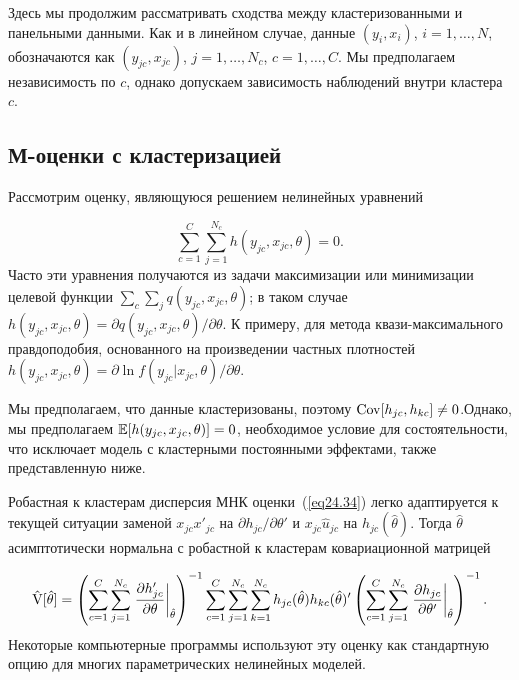 Здесь мы продолжим рассматривать сходства между кластеризованными и панельными данными. Как и в линейном случае, данные $(y_i, x_i)$, $i = 1, \dots, N$, обозначаются как $(y_{jc}, x_{jc})$, $j = 1, \dots, N_c$, $c = 1, \dots, C$. Мы предполагаем независимость по $c$, однако допускаем зависимость наблюдений внутри кластера $c$. 

\subsection*{М-оценки с кластеризацией}

Рассмотрим оценку, являющуюся решением нелинейных уравнений

\begin{equation}
\label{eq24.44}
\sum_{c=1}^{C} \sum_{j=1}^{N_c} h (y_{jc}, x_{jc}, \theta) = 0.
\end{equation}
Часто эти уравнения получаются из задачи максимизации или минимизации целевой функции $\sum_c \sum_j q(y_{jc}, x_{jc}, \theta)$; в таком случае $  h (y_{jc}, x_{jc}, \theta) = \partial q(y_{jc}, x_{jc}, \theta) / \partial \theta$. К примеру, для метода квази-максимального правдоподобия, основанного на произведении частных плотностей $ h (y_{jc}, x_{jc}, \theta) = \partial \ln{ f (y_{jc}| x_{jc}, \theta)} / \partial \theta$. 

Мы предполагаем, что данные кластеризованы, поэтому $\mathrm{Cov}[h_{jc}, h_{kc}] \ne 0$.Однако, мы предполагаем $\mathbb{E}[ h (y_{jc}, x_{jc}, \theta)] = 0$, необходимое условие для состоятельности, что исключает модель с кластерными постоянными эффектами, также представленную ниже. 

Робастная к кластерам дисперсия МНК оценки~(\ref{eq24.34}) легко адаптируется к текущей ситуации заменой $x_{jc} x'_{jc}$ на $\partial h_{jc} / \partial \theta'$ и $x_{jc} \hat u_{jc}$ на $h_{jc} (\hat \theta)$. Тогда $\hat \theta$ асимптотически нормальна с робастной к кластерам ковариационной матрицей

\begin{equation}
\label{eq24.45}
\hat {\mathrm{V}}[\hat \theta] = \left( \sum_{c=1}^C \sum_{j=1}^{N_c} \left. \frac{\partial h'_{jc}}{\partial \theta} \right| _{\hat \theta} \right)^{-1} \sum_{c=1}^C \sum_{j=1}^{N_c} \sum_{k=1}^{N_c} h_{jc}(\hat \theta) h_{kc} (\hat \theta)' \left( \sum_{c=1}^C \sum_{j=1}^{N_c} \left. \frac{\partial h_{jc}}{\partial \theta'} \right| _{\hat \theta} \right)^{-1}. 
\end{equation}
Некоторые компьютерные программы используют эту оценку как стандартную опцию для многих параметрических нелинейных моделей. 

